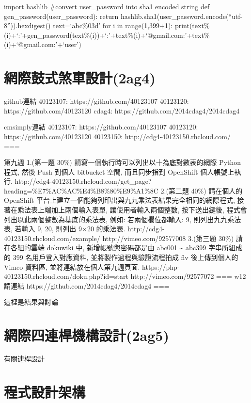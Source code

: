 \documentclass[]{article}
\begin{document}
import hashlib \#convert user\_password into sha1 encoded string def
gen\_password(user\_password): return
hashlib.sha1(user\_password.encode(``utf-8'')).hexdigest()
text=`abc\%03d' for i in range(1,399+1):
print(text\%(i)+`:'+gen\_password(text\%(i))+`:'+text\%(i)+`@gmail.com:'+text\%(i)+`@gmail.com:'+`user')

\section{網際鼓式煞車設計(2ag4)}\label{ux7db2ux969bux9f13ux5f0fux715eux8ecaux8a2dux8a082ag4}

github連結 40123107: https://github.com/40123107 40123120:
https://github.com/40123120 cdag4:
https://github.com/2014cdag4/2014cdag4

cmsimply連結 40123107: https://github.com/40123107 40123120:
https://github.com/40123120 40123150: http://cdg4-40123150.rhcloud.com/
===

第九週 1.(第一題 30\%) 請寫一個執行時可以列出以十為底對數表的網際 Python
程式, 然後 Push 到個人 bitbucket 空間, 而且同步指到 OpenShift
個人帳號上執行.
http://cdg4-40123150.rhcloud.com/get\_page?heading=\%E7\%AC\%AC\%E4\%B8\%80\%E9\%A1\%8C
2.(第二題 40\%) 請在個人的 OpenShift
平台上建立一個能夠列印出與九九乘法表結果完全相同的網際程式,
接著在乘法表上端加上兩個輸入表單, 讓使用者輸入兩個整數, 按下送出鍵後,
程式會列出以此兩個整數為基底的乘法表, 例如: 若兩個欄位都輸入: 9,
則列出九九乘法表, 若輸入 9, 20, 則列出 9×20 的乘法表.
http://cdg4-40123150.rhcloud.com/example/ http://vimeo.com/92577008
3.(第三題 30\%) 請在各組的雲端 dokuwiki 中, 新增帳號與密碼都是由 abc001
\textasciitilde{} abc399 字串所組成的 399 名用戶登入對應資料,
並將製作過程與驗證流程拍成 flv 後上傳到個人的 Vimeo 資料區,
並將連結放在個人第九週頁面.
https://php-40123150.rhcloud.com/doku.php?id=start
http://vimeo.com/92577072 === w12 請連結
https://github.com/2014cdag4/2014cdag4 ===

這裡是結果與討論

\section{網際四連桿機構設計(2ag5)}\label{ux7db2ux969bux56dbux9023ux687fux6a5fux69cbux8a2dux8a082ag5}

有關連桿設計

\section{程式設計架構}\label{ux7a0bux5f0fux8a2dux8a08ux67b6ux69cb-1}
\end{document}

